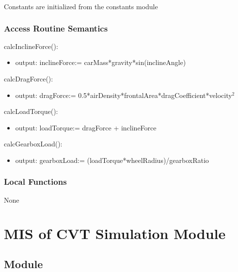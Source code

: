 \documentclass[12pt, titlepage]{article}
\begin{document}
Constants are initialized from the constants module

\subsubsection{Access Routine Semantics}

\noindent calcInclineForce():
\begin{itemize}
\item output: inclineForce:= carMass*gravity*sin(inclineAngle)
\end{itemize}

\noindent calcDragForce():
\begin{itemize}
\item output: dragForce:= 0.5*airDensity*frontalArea*dragCoefficient*velocity$^2$
\end{itemize}

\noindent calcLoadTorque():
\begin{itemize}
\item output: loadTorque:= dragForce + inclineForce
\end{itemize}

\noindent calcGearboxLoad():
\begin{itemize}
\item output: gearboxLoad:= (loadTorque*wheelRadius)/gearboxRatio 
\end{itemize}

\subsubsection{Local Functions}

None

\newpage

\section{MIS of CVT Simulation Module} \label{Module_cvt_simulation} 



\subsection{Module}

\end{document}
